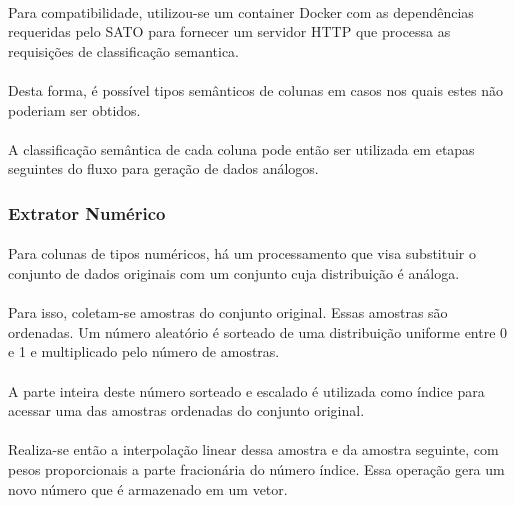 \paragraph{} Para compatibilidade, utilizou-se um container Docker com as dependências requeridas pelo SATO para fornecer um servidor HTTP que processa as requisições de classificação semantica.

\paragraph{} Desta forma, é possível tipos semânticos de colunas em casos nos quais estes não poderiam ser obtidos.

\paragraph{} A classificação semântica de cada coluna pode então ser utilizada em etapas seguintes do fluxo para geração de dados análogos.

\subsubsection{Extrator Numérico}

\paragraph{} Para colunas de tipos numéricos, há um processamento que visa substituir o conjunto de dados originais com um conjunto cuja distribuição é análoga.

\paragraph{} Para isso, coletam-se amostras do conjunto original. Essas amostras são ordenadas. Um número aleatório é sorteado de uma distribuição uniforme entre 0 e 1 e multiplicado pelo número de amostras.

\paragraph{} A parte inteira deste número sorteado e escalado é utilizada como índice para acessar uma das amostras ordenadas do conjunto original.

\paragraph{} Realiza-se então a interpolação linear dessa amostra e da amostra seguinte, com pesos proporcionais a parte fracionária do número índice. Essa operação gera um novo número que é armazenado em um vetor.

